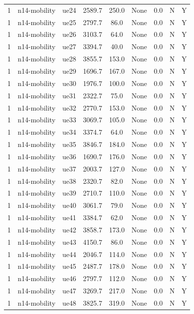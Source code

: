 \begin{table}[ht]
\begin{tabular}{|c|c|c|c|c|c|c|c|c|}
1 & n14-mobility & ue24 & 2589.7 & 250.0 & None & 0.0 & N & Y \\
1 & n14-mobility & ue25 & 2797.7 & 86.0 & None & 0.0 & N & Y \\
1 & n14-mobility & ue26 & 3103.7 & 64.0 & None & 0.0 & N & Y \\
1 & n14-mobility & ue27 & 3394.7 & 40.0 & None & 0.0 & N & Y \\
1 & n14-mobility & ue28 & 3855.7 & 153.0 & None & 0.0 & N & Y \\
1 & n14-mobility & ue29 & 1696.7 & 167.0 & None & 0.0 & N & Y \\
1 & n14-mobility & ue30 & 1976.7 & 100.0 & None & 0.0 & N & Y \\
1 & n14-mobility & ue31 & 2322.7 & 75.0 & None & 0.0 & N & Y \\
1 & n14-mobility & ue32 & 2770.7 & 153.0 & None & 0.0 & N & Y \\
1 & n14-mobility & ue33 & 3069.7 & 105.0 & None & 0.0 & N & Y \\
1 & n14-mobility & ue34 & 3374.7 & 64.0 & None & 0.0 & N & Y \\
1 & n14-mobility & ue35 & 3846.7 & 184.0 & None & 0.0 & N & Y \\
1 & n14-mobility & ue36 & 1690.7 & 176.0 & None & 0.0 & N & Y \\
1 & n14-mobility & ue37 & 2003.7 & 127.0 & None & 0.0 & N & Y \\
1 & n14-mobility & ue38 & 2320.7 & 82.0 & None & 0.0 & N & Y \\
1 & n14-mobility & ue39 & 2710.7 & 110.0 & None & 0.0 & N & Y \\
1 & n14-mobility & ue40 & 3061.7 & 79.0 & None & 0.0 & N & Y \\
1 & n14-mobility & ue41 & 3384.7 & 62.0 & None & 0.0 & N & Y \\
1 & n14-mobility & ue42 & 3858.7 & 173.0 & None & 0.0 & N & Y \\
1 & n14-mobility & ue43 & 4150.7 & 86.0 & None & 0.0 & N & Y \\
1 & n14-mobility & ue44 & 2046.7 & 114.0 & None & 0.0 & N & Y \\
1 & n14-mobility & ue45 & 2487.7 & 178.0 & None & 0.0 & N & Y \\
1 & n14-mobility & ue46 & 2797.7 & 112.0 & None & 0.0 & N & Y \\
1 & n14-mobility & ue47 & 3269.7 & 217.0 & None & 0.0 & N & Y \\
1 & n14-mobility & ue48 & 3825.7 & 319.0 & None & 0.0 & N & Y \\

\end{tabular}
\end{table}
